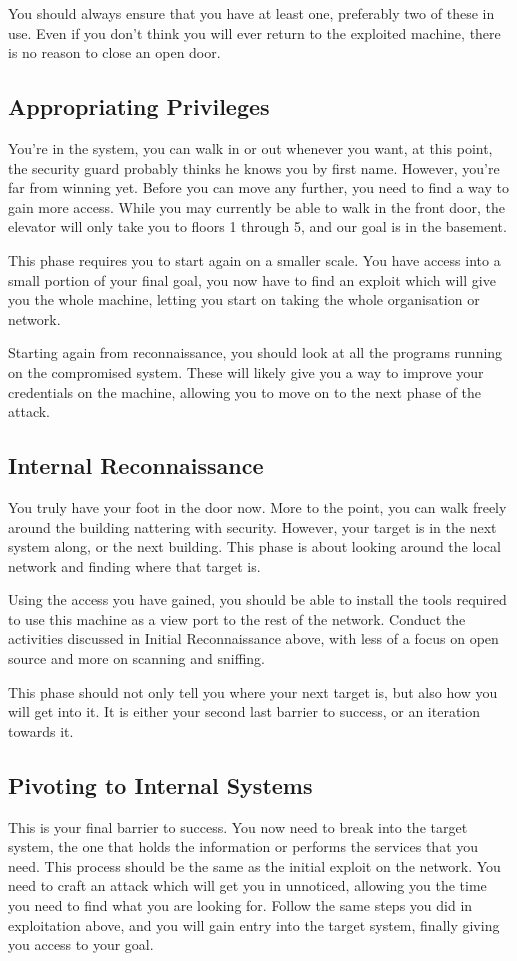 			You should always ensure that you have at least one, preferably two of these in use. 
			Even if you don't think you will ever return to the exploited machine, there is no reason to close an open door. 
		\subsection{Appropriating Privileges}
			You're in the system, you can walk in or out whenever you want, at this point, the security guard probably thinks he knows you by first name. 
			However, you're far from winning yet. 
			Before you can move any further, you need to find a way to gain more access. 
			While you may currently be able to walk in the front door, the elevator will only take you to floors 1 through 5, and our goal is in the basement. 

			This phase requires you to start again on a smaller scale. 
			You have access into a small portion of your final goal, you now have to find an exploit which will give you the whole machine, letting you start on taking the whole organisation or network. 

			Starting again from reconnaissance, you should look at all the programs running on the compromised system. 
			These will likely give you a way to improve your credentials on the machine, allowing you to move on to the next phase of the attack. 

		\subsection{Internal Reconnaissance}
			You truly have your foot in the door now. 
			More to the point, you can walk freely around the building nattering with security. 
			However, your target is in the next system along, or the next building. 
			This phase is about looking around the local network and finding where that target is. 

			Using the access you have gained, you should be able to install the tools required to use this machine as a view port to the rest of the network. 
			Conduct the activities discussed in Initial Reconnaissance above, with less of a focus on open source and more on scanning and sniffing. 

			This phase should not only tell you where your next target is, but also how you will get into it. 
			It is either your second last barrier to success, or an iteration towards it. 
		\subsection{Pivoting to Internal Systems}
			This is your final barrier to success. 
			You now need to break into the target system, the one that holds the information or performs the services that you need. 
			This process should be the same as the initial exploit on the network. 
			You need to craft an attack which will get you in unnoticed, allowing you the time you need to find what you are looking for. 
			Follow the same steps you did in exploitation above, and you will gain entry into the target system, finally giving you access to your goal. 
